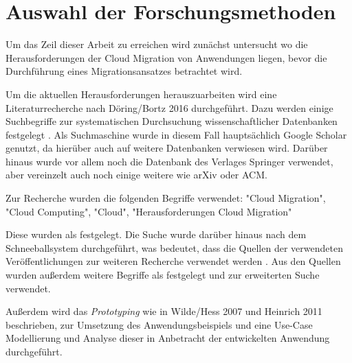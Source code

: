 \section{Auswahl der Forschungsmethoden}
\label{sec:auswahl_forschungsmethoden}

Um das Zeil dieser Arbeit zu erreichen wird zunächst untersucht wo die Herausforderungen der Cloud Migration von Anwendungen liegen, bevor die Durchführung eines Migrationsansatzes betrachtet wird.

Um die aktuellen Herausforderungen herauszuarbeiten wird eine Literaturrecherche nach Döring/Bortz 2016 durchgeführt. Dazu werden einige Suchbegriffe zur systematischen Durchsuchung wissenschaftlicher Datenbanken festgelegt \cite[Vgl.][S. 158]{Doering2016}. Als Suchmaschine wurde in diesem Fall hauptsächlich Google Scholar genutzt, da hierüber auch auf weitere Datenbanken verwiesen wird. Darüber hinaus wurde vor allem noch die Datenbank des Verlages Springer verwendet, aber vereinzelt auch noch einige weitere wie arXiv oder ACM.

Zur Recherche wurden die folgenden Begriffe verwendet: "Cloud Migration", "Cloud Computing", "Cloud", "Herausforderungen Cloud Migration"

Diese wurden als \textbf{\grqq{}} \cite[S. 158]{Doering2016} festgelegt. Die Suche wurde darüber hinaus nach dem Schneeballsystem durchgeführt, was bedeutet, dass die Quellen der verwendeten Veröffentlichungen zur weiteren Recherche verwendet werden \cite[Vgl.][S. 160]{Doering2016}. Aus den Quellen wurden außerdem weitere Begriffe als \textbf{\grqq{}} \cite[S. 158]{Doering2016} festgelegt und zur erweiterten Suche verwendet.

Außerdem wird das \textit{Prototyping} wie in Wilde/Hess 2007 und Heinrich 2011 beschrieben, zur Umsetzung des Anwendungsbeispiels und eine Use-Case Modellierung und Analyse dieser in Anbetracht der entwickelten Anwendung durchgeführt.